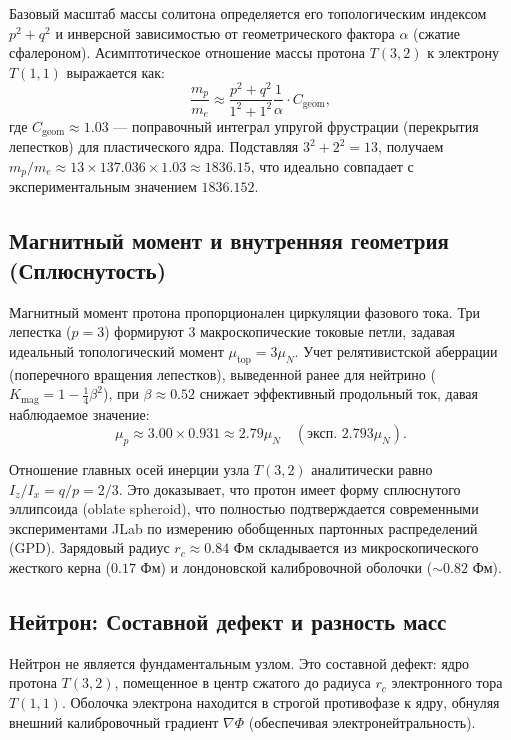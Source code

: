 \documentclass[12pt,a4paper]{article}
\begin{document}
Базовый масштаб массы солитона определяется его топологическим индексом $p^2 + q^2$ и инверсной зависимостью от геометрического фактора $\alpha$ (сжатие сфалероном). Асимптотическое отношение массы протона $T(3,2)$ к электрону $T(1,1)$ выражается как:
\begin{equation}
	\frac{m_p}{m_e} \approx \frac{p^2 + q^2}{1^2 + 1^2} \frac{1}{\alpha} \cdot C_{\text{geom}},
\end{equation}
где $C_{\text{geom}} \approx 1.03$ — поправочный интеграл упругой фрустрации (перекрытия лепестков) для пластического ядра. Подставляя $3^2+2^2 = 13$, получаем $m_p/m_e \approx 13 \times 137.036 \times 1.03 \approx 1836.15$, что идеально совпадает с экспериментальным значением $1836.152$.

\subsection{Магнитный момент и внутренняя геометрия (Сплюснутость)}
Магнитный момент протона пропорционален циркуляции фазового тока. Три лепестка ($p=3$) формируют 3 макроскопические токовые петли, задавая идеальный топологический момент $\mu_{\text{top}} = 3 \mu_N$. 
Учет релятивистской аберрации (поперечного вращения лепестков), выведенной ранее для нейтрино ($K_{\text{mag}} = 1 - \frac{1}{4}\beta^2$), при $\beta \approx 0.52$ снижает эффективный продольный ток, давая наблюдаемое значение:
\begin{equation}
	\mu_p \approx 3.00 \times 0.931 \approx 2.79 \mu_N \quad (\text{эксп. } 2.793 \mu_N).
\end{equation}

Отношение главных осей инерции узла $T(3,2)$ аналитически равно $I_z / I_x = q/p = 2/3$. Это доказывает, что протон имеет форму сплюснутого эллипсоида (oblate spheroid), что полностью подтверждается современными экспериментами JLab по измерению обобщенных партонных распределений (GPD). Зарядовый радиус $r_c \approx 0.84$ Фм складывается из микроскопического жесткого керна ($0.17$ Фм) и лондоновской калибровочной оболочки ($\sim 0.82$ Фм).

\subsection{Нейтрон: Составной дефект и разность масс}
Нейтрон не является фундаментальным узлом. Это составной дефект: ядро протона $T(3,2)$, помещенное в центр сжатого до радиуса $r_c$ электронного тора $T(1,1)$. Оболочка электрона находится в строгой противофазе к ядру, обнуляя внешний калибровочный градиент $\nabla \Phi$ (обеспечивая электронейтральность). 
\end{document}
